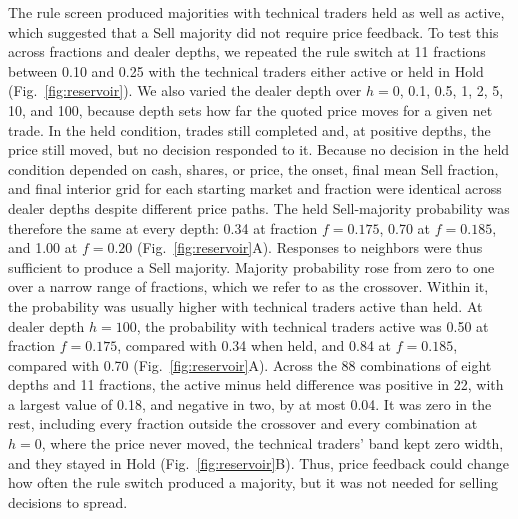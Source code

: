 The rule screen produced majorities with technical traders held as
well as active, which suggested that a Sell majority did not require
price feedback. To test this across
fractions and dealer depths, we repeated the rule switch at 11 fractions
between 0.10 and 0.25 with the technical traders either active or held
in Hold (Fig.~\ref{fig:reservoir}). We also varied the dealer depth over
$h=0$, 0.1, 0.5, 1, 2, 5, 10, and 100, because depth sets how far the
quoted price moves for a given net trade. In the held condition,
trades still completed and, at positive depths, the price still moved,
but no decision responded to it. Because no decision in the held
condition depended on cash, shares, or price, the onset, final mean Sell
fraction, and final interior grid for each starting market and fraction
were identical across dealer depths despite different price paths. The
held Sell-majority probability was therefore the same at every depth:
0.34 at fraction $f=0.175$, 0.70 at $f=0.185$, and
1.00 at $f=0.20$ (Fig.~\ref{fig:reservoir}A). Responses to neighbors
were thus sufficient to produce a Sell majority.
Majority probability rose from zero to one over a narrow range of
fractions, which we refer to as the crossover. Within it, the
probability was usually higher with technical traders active than
held. At dealer depth $h=100$, the probability
with technical traders active was 0.50 at fraction $f=0.175$, compared
with 0.34 when held, and 0.84 at $f=0.185$, compared with 0.70
(Fig.~\ref{fig:reservoir}A). Across the 88 combinations of eight depths and 11 fractions, the active
minus held difference was positive in 22, with a largest value of 0.18,
and negative in two, by at most 0.04. It was zero in the rest, including
every fraction outside the crossover and every combination at $h=0$,
where the price never moved, the technical traders' band kept zero
width, and they stayed in Hold
(Fig.~\ref{fig:reservoir}B). Thus, price feedback could change how
often the rule switch produced a majority, but it was not needed for
selling decisions to spread.



